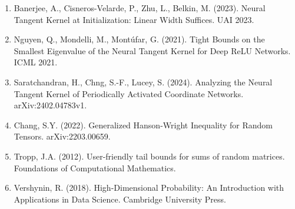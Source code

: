 \documentclass{article}
\begin{document}
\begin{enumerate}
    \item Banerjee, A., Cisneros-Velarde, P., Zhu, L., Belkin, M. (2023). Neural Tangent Kernel at Initialization: Linear Width Suffices. UAI 2023.
    
    \item Nguyen, Q., Mondelli, M., Montúfar, G. (2021). Tight Bounds on the Smallest Eigenvalue of the Neural Tangent Kernel for Deep ReLU Networks. ICML 2021.
    
    \item Saratchandran, H., Chng, S.-F., Lucey, S. (2024). Analyzing the Neural Tangent Kernel of Periodically Activated Coordinate Networks. arXiv:2402.04783v1.
    
    \item Chang, S.Y. (2022). Generalized Hanson-Wright Inequality for Random Tensors. arXiv:2203.00659.
    
    \item Tropp, J.A. (2012). User-friendly tail bounds for sums of random matrices. Foundations of Computational Mathematics.
    
    \item Vershynin, R. (2018). High-Dimensional Probability: An Introduction with Applications in Data Science. Cambridge University Press.
\end{enumerate}
\end{document}
